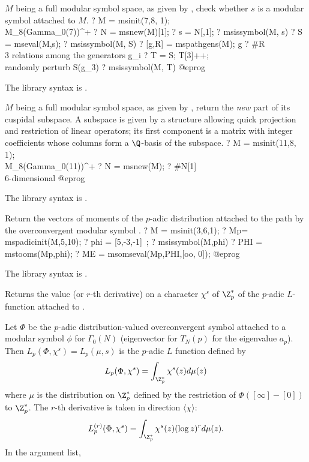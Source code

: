 \label{se:msissymbol}
$M$ being a full modular symbol space, as given by ,
check whether $s$ is a modular symbol attached to $M$.
\bprog
? M = msinit(7,8, 1); \\ M_8(Gamma_0(7))^+
? N = msnew(M)[1];
? s = N[,1];
? msissymbol(M, s)
? S = mseval(M,s);
? msissymbol(M, S)
? [g,R] = mspathgens(M); g
? #R  \\ 3 relations among the generators g_i
? T = S; T[3]++; \\ randomly perturb S(g_3)
? msissymbol(M, T)
@eprog

The library syntax is .

\label{se:msnew}
$M$ being a full modular symbol space, as given by ,
return the \emph{new} part of its cuspidal subspace. A subspace is given by
a structure allowing quick projection and restriction of linear operators;
its first component is a matrix with integer coefficients whose columns form
a $\Q$-basis of the subspace.
\bprog
? M = msinit(11,8, 1); \\ M_8(Gamma_0(11))^+
? N = msnew(M);
? #N[1]  \\ 6-dimensional
@eprog

The library syntax is .

\label{se:msomseval}
Return the vectors of moments of the $p$-adic distribution attached
to the path  by the overconvergent modular symbol .
\bprog
? M = msinit(3,6,1);
? Mp= mspadicinit(M,5,10);
? phi = [5,-3,-1]~;
? msissymbol(M,phi)
? PHI = mstooms(Mp,phi);
? ME = msomseval(Mp,PHI,[oo, 0]);
@eprog

The library syntax is .

\label{se:mspadicL}
Returns the value (or $r$-th derivative)
on a character $\chi^s$ of $\Z_p^*$ of the $p$-adic $L$-function
attached to .

Let $\Phi$ be the $p$-adic distribution-valued overconvergent symbol
attached to a modular symbol $\phi$ for $\Gamma_0(N)$ (eigenvector for
$T_N(p)$ for the eigenvalue $a_p$). Then $L_p(\Phi,\chi^s)=L_p(\mu,s)$ is the
$p$-adic $L$ function defined by
$$L_p(\Phi,\chi^s)= \int_{\Z_p^*} \chi^s(z) d\mu(z)$$
where $\mu$ is the distribution on $\Z_p^*$ defined by the restriction of
$\Phi([\infty]-[0])$ to $\Z_p^*$. The $r$-th derivative is taken in
direction $\langle \chi\rangle$:
$$L_p^{(r)}(\Phi,\chi^s)= \int_{\Z_p^*} \chi^s(z) (\log z)^r d\mu(z).$$
In the argument list,

